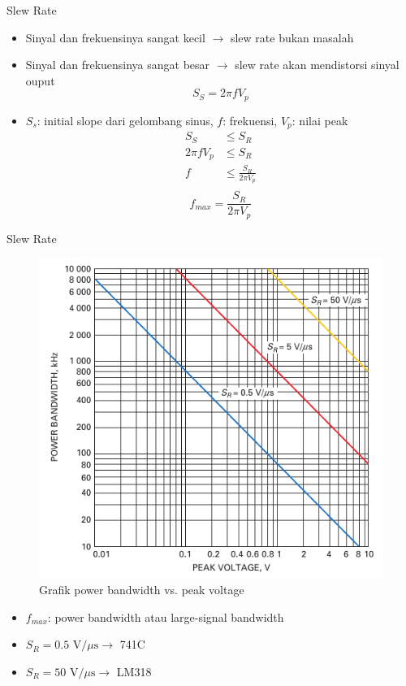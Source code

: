\begin{frame}{Slew Rate}
	\begin{itemize}
		\item Sinyal dan frekuensinya sangat kecil $ \rightarrow $ slew rate bukan masalah
		\item Sinyal dan frekuensinya sangat besar $ \rightarrow $ slew rate akan mendistorsi sinyal ouput
		\[ S_S = 2 \pi f V_p \]
		\item $ S_s $: initial slope dari gelombang sinus, $ f $: frekuensi, $ V_p $: nilai peak
		\begin{align*}
			S_S &\leq S_R \\
			2 \pi f V_p &\leq S_R \\
			f &\leq \frac{S_R}{2 \pi V_p} \\
		\end{align*}
		\begin{equation} \label{pers.16.2}
			f_{max} = \frac{S_R}{2 \pi V_p}
		\end{equation}
	\end{itemize}
\end{frame}

\begin{frame}{Slew Rate}
	\begin{multicols}{2}
		\begin{figure}
			\centering
			\includegraphics[width=0.8\linewidth]{gambar/fig-16.10}
			\caption{Grafik power bandwidth vs. peak voltage}
			\label{fig-16.10}
		\end{figure}
		\columnbreak
		\begin{itemize}
			\item  $ f_{max} $: power bandwidth atau large-signal bandwidth
			\item $ S_R = 0.5 \text{ V/}\mu\text{s} \rightarrow $ 741C
			\item $ S_R = 50 \text{ V/}\mu\text{s} \rightarrow $ LM318
		\end{itemize}
	\end{multicols}	
\end{frame}

